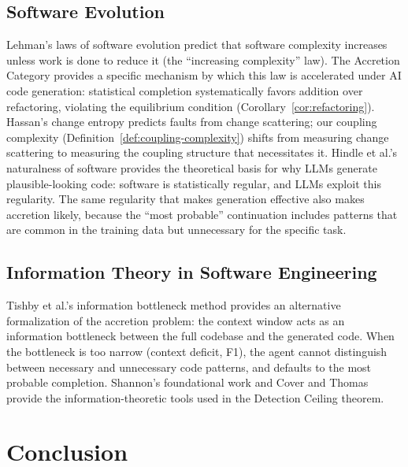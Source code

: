 \documentclass[11pt, a4paper, logo, copyright]{googledeepmind}
\begin{document}
\subsection{Software Evolution}

Lehman's laws of software evolution \citep{Lehman1980} predict that software complexity increases unless work is done to reduce it (the ``increasing complexity'' law). The Accretion Category provides a specific mechanism by which this law is accelerated under AI code generation: statistical completion systematically favors addition over refactoring, violating the equilibrium condition (Corollary~\ref{cor:refactoring}). Hassan's change entropy \citep{hassan2009} predicts faults from change scattering; our coupling complexity (Definition~\ref{def:coupling-complexity}) shifts from measuring change scattering to measuring the coupling structure that necessitates it. Hindle et al.'s naturalness of software \citep{hindle2012naturalness} provides the theoretical basis for why LLMs generate plausible-looking code: software is statistically regular, and LLMs exploit this regularity. The same regularity that makes generation effective also makes accretion likely, because the ``most probable'' continuation includes patterns that are common in the training data but unnecessary for the specific task.

\subsection{Information Theory in Software Engineering}

Tishby et al.'s information bottleneck method \citep{tishby2000information} provides an alternative formalization of the accretion problem: the context window acts as an information bottleneck between the full codebase and the generated code. When the bottleneck is too narrow (context deficit, F1), the agent cannot distinguish between necessary and unnecessary code patterns, and defaults to the most probable completion. Shannon's foundational work \citep{shannon1948} and Cover and Thomas \citep{cover2006} provide the information-theoretic tools used in the Detection Ceiling theorem.


\section{Conclusion}
\end{document}

